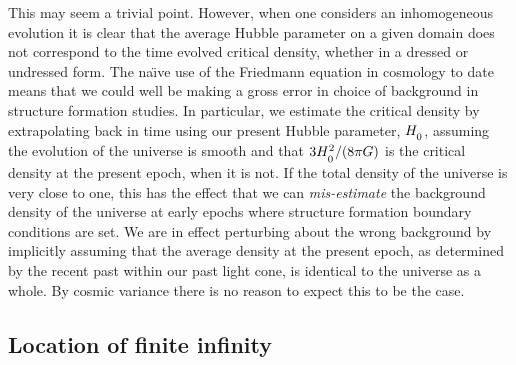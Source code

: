 \documentclass[12pt]{article}
\begin{document}
This may seem a trivial point. However, when one considers
an inhomogeneous evolution it is clear that the average Hubble parameter
on a given domain does not correspond to the time evolved critical density,
whether in a dressed or undressed form. The na\"{\i}ve use of the Friedmann
equation in cosmology to date means that we could well be making a gross
error in choice of background in structure formation studies. In
particular, we estimate the critical density by extrapolating back in time
using our present Hubble parameter, $\Hm$, assuming the evolution of the
universe is smooth and that $3\Hm^2/(8\pi G)$ is the critical density at the
present epoch, when it is not.
If the total density of the universe is very close to one, this has the
effect that we can {\em mis-estimate} the background density of the universe
at early epochs where structure formation boundary conditions are set.
We are in effect perturbing about the wrong background by implicitly
assuming that the average density at the present epoch, as determined by
the recent past within our past light cone, is identical to the universe
as a whole. By cosmic variance there is no reason to expect this to be
the case.

\subsection{Location of finite infinity}
\end{document}

